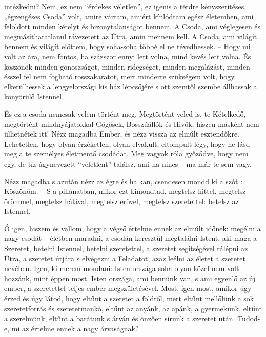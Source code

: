 \documentclass{IEEEtran}
\begin{document}
intézkedni?
Nem, ez nem “érdekes véletlen”, ez igenis a térdre kényszerítéses, „égzengéses
Csoda” volt, amire vártam, amiért kínlódtam egész életemben, ami feloldott
minden kételyt és bizonytalanságot bennem. A Csoda, ami véglegesen és
megmásíthatatlanul rávezetett az Útra, amin mennem kell. A Csoda, ami világít
bennem és világít előttem, hogy soha-soha többé el ne tévedhessek. – Hogy mi
volt az ára, nem fontos, ha százszor ennyi lett volna, mind kevés lett volna.
És köszönök minden gonoszságot, minden ridegséget, minden megalázást, minden
ésszel fel nem fogható rosszakaratot, mert minderre szükségem volt, hogy
elkerülhessek a lengyelországi kis ház lépcsőjére s ott szemtől szembe
állhassak a könyörülő Istennel.

És ez a csoda nemcsak velem történt meg. Megtörtént veled is, te Kételkedő,
megtörtént mindnyájatokkal Gőgösek, Bosszúállók és Hivők, hiszen másként nem
ülhetnétek itt! Nézz magadba Ember, és nézz vissza az elmúlt esztendőkre.
Lehetetlen, hogy olyan érzéketlen, olyan elvakult, eltompult légy, hogy ne
lásd meg a te személyes életmentő csodádat. Meg vagyok róla győződve, hogy nem
egy, de tíz úgynevezett “véletlent” találsz, ami ha nincs – ma már te sem
vagy.

Nézz magadba s azután nézz az égre és halkan, csendesen mondd ki a szót :
Köszönöm. – S a pillanatban, mikor ezt kimondtad, megtelsz hittel, megtelsz
örömmel, megtelsz hálával, megtelsz erővel, megtelsz szeretettel: betelsz az
Istennel.

Ó igen, hiszem és vallom, hogy a végső értelme ennek az elmúlt időnek: megélni
a nagy csodát – életben maradni, a csodán keresztül megtalálni Istent, aki
maga a Szeretet, betelni Istennel, betelni szeretettel, a szeretet
segítségével rálépni az Útra, a szeretet útjára s elvégezni a Feladatot, azaz
leélni az életet a szeretet nevében. Igen, ki merem mondani: Isten országa
soha olyan közel nem volt hozzánk, mint éppen most. Isten országa, ami bennünk
van, s ami egyenlő az új ember, a szeretettel teljes ember megszületésével.
Most, igen most, amikor úgy érzed és úgy látod, hogy eltűnt a szeretet a
földről, mert eltűnt mellőlünk a sok szeretetforrás és szeretetmankó, eltűnt
az anyánk, az apánk, a gyermekünk, eltűnt a szerelmünk, eltűnt a barátunk s
árván és önzően sírunk a szeretet után. Tudod-e, mi az értelme ennek a nagy
árvaságnak?
\end{document}
